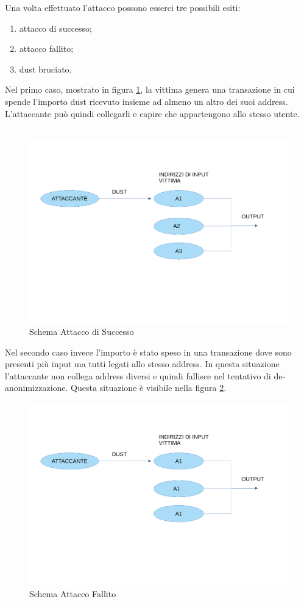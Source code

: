 \FloatBarrier
Una volta effettuato l'attacco possono esserci tre possibili esiti: 
    \begin{enumerate}
        \item attacco di successo;
        \item attacco fallito;
        \item dust bruciato.
    \end{enumerate}
Nel primo caso, mostrato in figura \ref{fig:success}, la vittima genera una transazione in cui spende l'importo dust ricevuto insieme ad almeno un altro dei suoi address. L'attaccante può quindi collegarli e capire che appartengono allo stesso utente.\\\\
\begin{figure}[h!]
    \centering
    \includegraphics[scale=0.3]{Images/successo.pdf}
    \caption{Schema Attacco di Successo}
    \label{fig:success}
\end{figure}
\FloatBarrier
Nel secondo caso invece l'importo è stato speso in una transazione dove sono presenti più input ma tutti legati allo stesso address. In questa situazione l'attaccante non collega address diversi e quindi fallisce nel tentativo di de-anonimizzazione. Questa situazione è visibile nella figura \ref{fig:fallito}. 
\begin{figure}[h!]
    \centering
    \includegraphics[scale=0.35]{Images/fallimento.pdf}
    \caption{Schema Attacco Fallito}
    \label{fig:fallito}
\end{figure}
